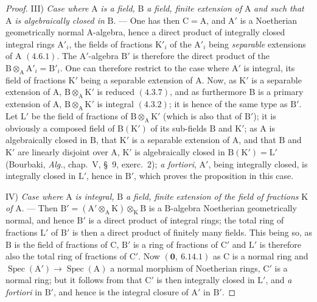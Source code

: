 \begin{proof}
III) \emph{Case where} $\mathrm{A}$ \emph{is a field,} $\mathrm{B}$ \emph{a field, finite extension of} $\mathrm{A}$ \emph{and such that} $\mathrm{A}$ \emph{is algebraically
closed in} $\mathrm{B}$. --- One has then $\mathrm{C}=\mathrm{A}$, and $\mathrm{A}'$ is a Noetherian geometrically
normal $\mathrm{A}$-algebra, hence a direct product of integrally closed integral rings $\mathrm{A}'_i$, the
fields of fractions $\mathrm{K}'_i$ of the $\mathrm{A}'_i$ being \emph{separable} extensions of $\mathrm{A}$ $(4.6.1)$. The $\mathrm{A}'$-algebra $\mathrm{B}'$
is therefore the direct product of the $\mathrm{B}\otimes_\mathrm{A}\mathrm{A}'_i=\mathrm{B}'_i$. One can therefore restrict to the case where $\mathrm{A}'$ is
integral, its field of fractions $\mathrm{K}'$ being a separable extension of $\mathrm{A}$. Now, as $\mathrm{K}'$
is a separable extension of $\mathrm{A}$, $\mathrm{B}\otimes_\mathrm{A}\mathrm{K}'$ is reduced $(4.3.7)$, and as furthermore $\mathrm{B}$ is a
primary extension of $\mathrm{A}$, $\mathrm{B}\otimes_\mathrm{A}\mathrm{K}'$ is integral $(4.3.2)$; it is hence of the same type as $\mathrm{B}'$.
Let $\mathrm{L}'$ be the field of fractions of $\mathrm{B}\otimes_\mathrm{A}\mathrm{K}'$ (which is also that of $\mathrm{B}'$); it is obviously a
composed field of $\mathrm{B}(\mathrm{K}')$ of its sub-fields $\mathrm{B}$ and $\mathrm{K}'$; as $\mathrm{A}$ is algebraically closed in $\mathrm{B}$,
that $\mathrm{K}'$ is a separable extension of $\mathrm{A}$, and that $\mathrm{B}$ and $\mathrm{K}'$ are linearly disjoint over $\mathrm{A}$,
$\mathrm{K}'$ is algebraically closed in $\mathrm{B}(\mathrm{K}')=\mathrm{L}'$ (Bourbaki, \emph{Alg.}, chap.~V, \S~9, exerc.~2);
\emph{a fortiori}, $\mathrm{A}'$, being integrally closed, is integrally closed in $\mathrm{L}'$, hence in $\mathrm{B}'$,
which proves the proposition in this case.

IV) \emph{Case where} $\mathrm{A}$ \emph{is integral,} $\mathrm{B}$ \emph{a field, finite extension of the field of fractions} $\mathrm{K}$ \emph{of} $\mathrm{A}$. ---
Then $\mathrm{B}'=(\mathrm{A}'\otimes_\mathrm{A}\mathrm{K})\otimes_\mathrm{K}\mathrm{B}$ is a $\mathrm{B}$-algebra Noetherian geometrically normal, and
hence $\mathrm{B}'$ is a direct product of integral rings; the total ring of fractions $\mathrm{L}'$ of $\mathrm{B}'$
is then a direct product of finitely many fields. This being so, as $\mathrm{B}$ is the field of
fractions of $\mathrm{C}$, $\mathrm{B}'$ is a ring of fractions of $\mathrm{C}'$ and $\mathrm{L}'$ is therefore also the total ring of
fractions of $\mathrm{C}'$. Now $(\mathbf{0},~6.14.1)$ as $\mathrm{C}$ is a normal ring and $\operatorname{Spec}(\mathrm{A}')\to\operatorname{Spec}(\mathrm{A})$
a normal morphism of Noetherian rings, $\mathrm{C}'$ is a normal ring; but it follows from
 that $\mathrm{C}'$ is then integrally closed in $\mathrm{L}'$, and \emph{a fortiori} in $\mathrm{B}'$, and hence
is the integral closure of $\mathrm{A}'$ in $\mathrm{B}'$.


\end{proof}

